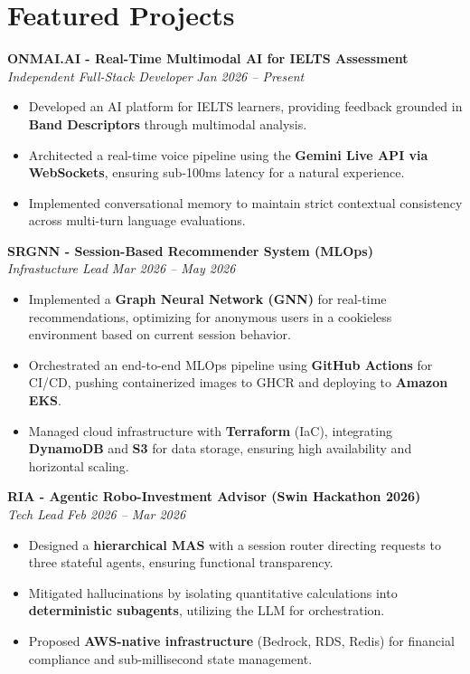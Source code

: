\documentclass[10pt, a4paper]{article}
\newcommand{\entryheader}[4]{
    \noindent\textbf{#1} \hfill #2 \\
    \textit{#3} \hfill \textit{#4} \par
}
\begin{document}
\section{Featured Projects}
\entryheader{ONMAI.AI - Real-Time Multimodal AI for IELTS Assessment}{}{Independent Full-Stack Developer}{Jan 2026 -- Present}
\begin{itemize}
    \item Developed an AI platform for IELTS learners, providing feedback grounded in \textbf{Band Descriptors} through multimodal analysis.
    \item Architected a real-time voice pipeline using the \textbf{Gemini Live API via WebSockets}, ensuring sub-100ms latency for a natural experience.
    \item Implemented conversational memory to maintain strict contextual consistency across multi-turn language evaluations.
\end{itemize}

\vspace{3pt}
\entryheader{SRGNN - Session-Based Recommender System (MLOps)}{}{Infrastucture Lead}{Mar 2026 -- May 2026}
\begin{itemize}
    \item Implemented a \textbf{Graph Neural Network (GNN)} for real-time recommendations, optimizing for anonymous users in a cookieless environment based on current session behavior.
    \item Orchestrated an end-to-end MLOps pipeline using \textbf{GitHub Actions} for CI/CD, pushing containerized images to GHCR and deploying to \textbf{Amazon EKS}.
    \item Managed cloud infrastructure with \textbf{Terraform} (IaC), integrating \textbf{DynamoDB} and \textbf{S3} for data storage, ensuring high availability and horizontal scaling.
\end{itemize}

\vspace{3pt}
\entryheader{RIA - Agentic Robo-Investment Advisor (Swin Hackathon 2026)}{}{Tech Lead}{Feb 2026 -- Mar 2026}
\begin{itemize}
    \item Designed a \textbf{hierarchical MAS} with a session router directing requests to three stateful agents, ensuring functional transparency.
    \item Mitigated hallucinations by isolating quantitative calculations into \textbf{deterministic subagents}, utilizing the LLM for orchestration.
    \item Proposed \textbf{AWS-native infrastructure} (Bedrock, RDS, Redis) for financial compliance and sub-millisecond state management.
\end{itemize}
\end{document}
